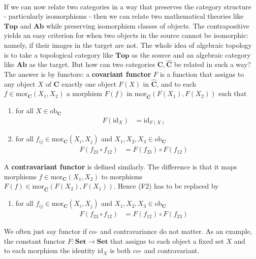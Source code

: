 \\
If we can now relate two categories in a way that preserves the category structure - particularly isomorphisms - then we can relate two mathematical theories like $\mathbf{Top}$ and $\mathbf{Ab}$ while preserving isomorphism classes of objects.
The contrapositive yields an easy criterion for when two objects in the source cannot be isomorphic: namely, if their images in the target are not.
The whole idea of algebraic topology is to take a topological category like $\mathbf{Top}$ as the source and an algebraic category like $\mathbf{Ab}$ as the target.
But how can two categories $\mathbf{C},\hat{\mathbf{C}}$ be related in such a way? The answer is by functors: a \textbf{covariant functor} $F$ is a function that assigns to any object $X$ of $\mathbf{C}$ exactly one object $F(X)$ in $\hat{\mathbf{C}}$, and to each $f \in \mathrm{mor}_{\mathbf{C}}(X_{1},X_{2})$ a morphism $F(f)$ in $\mathrm{mor}_{\hat{\mathbf{C}}}(F(X_{1}),F(X_{2}))$ such that
\begin{enumerate}
\item[(F1)]
for all $X \in \mathrm{ob}_{\mathbf{C}}$
\begin{align*}
  F(\mathrm{id}_{X})
  &=
  \mathrm{id}_{F(X)}
\end{align*}
\item[(F2)]
for all $f_{ij} \in \mathrm{mor}_{\mathbf{C}}(X_{i},X_{j})$ and $X_{1},X_{2},X_{3} \in \mathrm{ob}_{\mathbf{C}}$
\begin{align*}
  F(f_{23} \circ f_{12})
  &=
  F(f_{23})
  \circ
  F(f_{12}) 
\end{align*}
\end{enumerate}
A \textbf{contravariant functor} is defined similarly.
The difference is that it maps morphisms $f \in \mathrm{mor}_{\mathbf{C}}(X_{1},X_{2})$ to morphisms $F(f) \in \mathrm{mor}_{\hat{\mathbf{C}}}(F(X_{2}),F(X_{1}))$.
Hence (F2) has to be replaced by
\begin{enumerate}
\item[(F2$^{\prime}$)]
for all $f_{ij} \in \mathrm{mor}_{\mathbf{C}}(X_{i},X_{j})$ and $X_{1},X_{2},X_{3} \in \mathrm{ob}_{\mathbf{C}}$
\begin{align*}
  F(f_{23} \circ f_{12})
  &=
  F(f_{12})
  \circ
  F(f_{23}) 
\end{align*}
\end{enumerate}
We often just say functor if co- and contravariance do not matter.
As an example, the constant functor $F \colon \mathbf{Set} \to \mathbf{Set}$ that assigns to each object a fixed set $X$ and to each morphism the identity $\mathrm{id}_{X}$ is both co- and contravariant.
